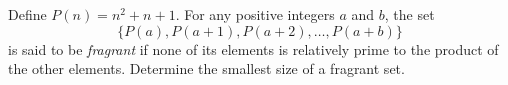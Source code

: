 Define $P(n) = n^{2} + n + 1$. For any positive integers $a$ and $b$, the set
\[
\{P(a), P(a+1), P(a+2), \ldots, P(a+b)\}
\]
is said to be \emph{fragrant} if none of its elements is relatively prime to the product of the other elements. Determine the smallest size of a fragrant set.
